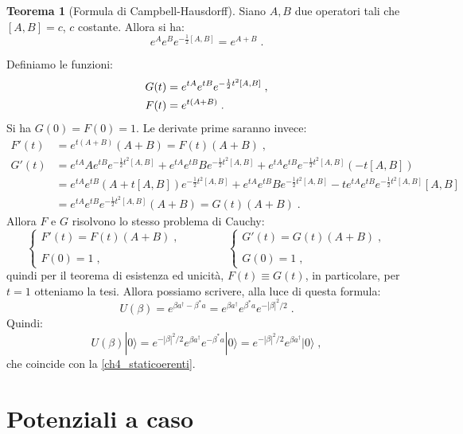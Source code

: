 \documentclass[12pt,a4paper]{report}
\theoremstyle{definition}
\newtheorem{thm}{Teorema}[section]
\numberwithin{equation}{section}
\newcommand{\ket}{\rangle}
\newcommand{\adj}[1]{#1^{\dagger}}
\begin{document}
\begin{thm}[Formula di Campbell-Hausdorff]
Siano $A,B$ due operatori tali che $[A,B]=c$, $c$ costante. Allora si ha:
\begin{equation}
e^Ae^Be^{-\frac{1}{2}[A,B]}=e^{A+B}\;.
\end{equation}
\end{thm}
\proof
Definiamo le funzioni:
\begin{align}
G(t) &= e^{tA}e^{tB}e^{-\frac{1}{2}t^2[A,B]}\;, \notag \\
F(t) &= e^{t(A+B)}\;.
\end{align}
Si ha $G(0)=F(0)=1$. Le derivate prime saranno invece:
\begin{align*}
F'(t)&=e^{t(A+B)}(A+B)=F(t)(A+B)\;, \\
G'(t)&= e^{tA}Ae^{tB}e^{-\frac{1}{2}t^2[A,B]}+e^{tA}e^{tB}Be^{-\frac{1}{2}t^2[A,B]}+e^{tA}e^{tB}e^{-\frac{1}{2}t^2[A,B]}(-t[A,B]) \\
&= e^{tA}e^{tB}(A+t[A,B])e^{-\frac{1}{2}t^2[A,B]}+e^{tA}e^{tB}Be^{-\frac{1}{2}t^2[A,B]}-te^{tA}e^{tB}e^{-\frac{1}{2}t^2[A,B]}[A,B] \\
&= e^{tA}e^{tB}e^{-\frac{1}{2}t^2[A,B]}(A+B)=G(t)(A+B)\;.
\end{align*}
Allora $F$ e $G$ risolvono lo stesso problema di Cauchy:
$$
\begin{cases}
F'(t)=F(t)(A+B)\;, \\
\\
F(0)=1\;,
\end{cases} \qquad\qquad
\begin{cases}
G'(t)=G(t)(A+B)\;, \\
\\
G(0)=1\;,
\end{cases}
$$
quindi per il teorema di esistenza ed unicità, $F(t)\equiv G(t)$, in particolare, per $t=1$ otteniamo la tesi.
\endproof
Allora possiamo scrivere, alla luce di questa formula:
\begin{equation}
U(\beta)=e^{\beta\adj{a}-\beta^*a}=e^{\beta\adj{a}}e^{\beta^*a}e^{-|\beta|^2/2}\;.
\end{equation}
Quindi:
\begin{equation}
U(\beta)|0\ket=e^{-|\beta|^2/2}e^{\beta\adj{a}}e^{-\beta^*a}|0\ket=e^{-|\beta|^2/2}e^{\beta\adj{a}}|0\ket\;,
\end{equation}
che coincide con la \eqref{ch4_staticoerenti}.
\chapter{Potenziali a caso}
\end{document}

